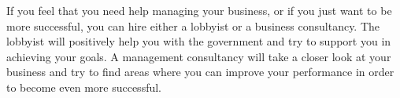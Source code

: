 If you feel that you need help managing your business, or if you just want to be more successful, you can hire either a lobbyist or a business consultancy. The lobbyist will positively help you with the government and try to support you in achieving your goals. 
A management consultancy will take a closer look at your business and try to find areas where you can improve your performance in order to become even more successful.